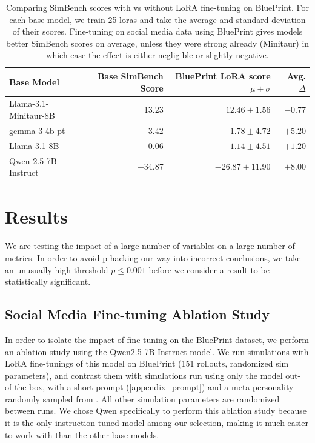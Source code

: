 \documentclass{article} %
\begin{document}
\begin{table}[h]
\centering
\begin{tabular}{lrrr}
\toprule
Base Model & Base SimBench Score & BluePrint LoRA score $\mu \pm \sigma$ & Avg. $\Delta$ \\
\midrule
Llama-3.1-Minitaur-8B & 13.23 & $12.46\pm1.56$ & $-0.77$ \\
gemma-3-4b-pt         & $-3.42$ & $1.78\pm4.72$  & $+5.20$ \\
Llama-3.1-8B          & $-0.06$ & $1.14\pm4.51$  & $+1.20$ \\
Qwen-2.5-7B-Instruct  & $-34.87$ & $-26.87\pm11.90$ & $+8.00$ \\
\bottomrule
\end{tabular}
\caption{Comparing SimBench scores with vs without LoRA fine-tuning on BluePrint. For each base model, we train 25 loras and take the average and standard deviation of their scores. Fine-tuning on social media data using BluePrint gives models better SimBench scores on average, unless they were strong already (Minitaur) in which case the effect is either negligible or slightly negative.}
\label{tab:lora_scores_std}
\end{table}

\section{Results}

We are testing the impact of a large number of variables on a large number of metrics. In order to avoid p-hacking our way into incorrect conclusions, we take an unusually high threshold $p\leq0.001$ before we consider a result to be statistically significant.

\subsection{Social Media Fine-tuning Ablation Study}
\label{blueprint_results}

In order to isolate the impact of fine-tuning on the BluePrint dataset, we perform an ablation study using the Qwen2.5-7B-Instruct model. We run simulations with LoRA fine-tunings of this model on BluePrint (151 rollouts, randomized sim parameters), and contrast them with simulations run using only the model out-of-the-box, with a short prompt (\ref{appendix_prompt}) and a meta-personality randomly sampled from \citet{li2025llmgeneratedpersonapromise}. All other simulation parameters are randomized between runs. We chose Qwen specifically to perform this ablation study because it is the only instruction-tuned model among our selection, making it much easier to work with than the other base models. 
\end{document}
